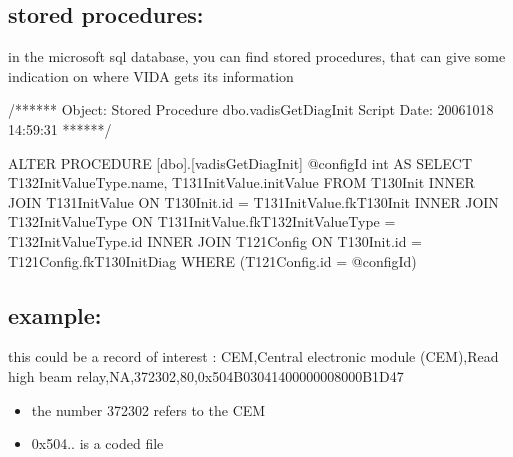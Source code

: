 \documentclass[letterpaper,10pt,english]{sphinxmanual}
\begin{document}
\sphinxAtStartPar
{}


\subsection{stored procedures:}
\label{\detokenize{software/vida:stored-procedures}}
\sphinxAtStartPar
in the microsoft sql database, you can find stored procedures, that can give some indication on where VIDA gets its information

\begin{sphinxVerbatim}[commandchars=\\\{\}]
/****** Object:  Stored Procedure dbo.vadis\PYGZus{}GetDiagInit    Script Date: 2006\PYGZhy{}10\PYGZhy{}18 14:59:31 ******/

ALTER  PROCEDURE [dbo].[vadis\PYGZus{}GetDiagInit]
@configId int
AS
SELECT     T132\PYGZus{}InitValueType.name,
    T131\PYGZus{}InitValue.initValue
FROM
  T130\PYGZus{}Init
INNER JOIN
         T131\PYGZus{}InitValue ON T130\PYGZus{}Init.id = T131\PYGZus{}InitValue.fkT130\PYGZus{}Init
INNER JOIN
         T132\PYGZus{}InitValueType ON T131\PYGZus{}InitValue.fkT132\PYGZus{}InitValueType = T132\PYGZus{}InitValueType.id
INNER JOIN
  T121\PYGZus{}Config ON T130\PYGZus{}Init.id = T121\PYGZus{}Config.fkT130\PYGZus{}Init\PYGZus{}Diag
WHERE
 (T121\PYGZus{}Config.id = @configId)
\end{sphinxVerbatim}


\subsection{example:}
\label{\detokenize{software/vida:example}}
\sphinxAtStartPar
this could be a record of interest :
CEM,Central electronic module (CEM),Read high beam relay,NA,372302,80,0x504B03041400000008000B1D47
\begin{itemize}
\item {} 
\sphinxAtStartPar
the number 372302 refers to the CEM

\item {} 
\sphinxAtStartPar
0x504.. is a coded file

\end{itemize}
\end{document}
